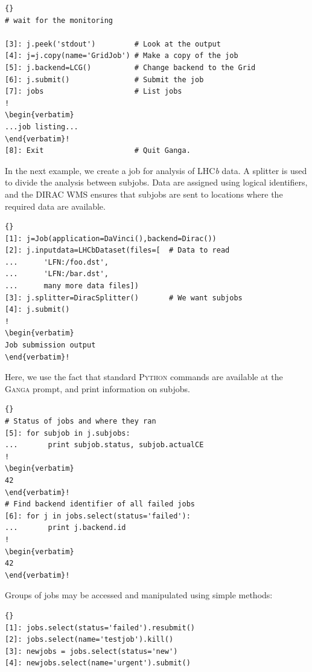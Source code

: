 \documentclass{elsart}
\def\lhcb {LHC{\em b\/}\xspace}
\def\dirac{DIRAC\xspace}
\def\ganga {\textsc{Ganga}\xspace}
\def\python {\textsc{Python}\xspace}
\begin{document}
\begin{linenumbers}
\begin{lstlisting}[escapechar=!]{}
# wait for the monitoring

[3]: j.peek('stdout')         # Look at the output
[4]: j=j.copy(name='GridJob') # Make a copy of the job
[5]: j.backend=LCG()          # Change backend to the Grid
[6]: j.submit()               # Submit the job
[7]: jobs                     # List jobs
!
\begin{verbatim}
...job listing...
\end{verbatim}!
[8]: Exit                     # Quit Ganga.
\end{lstlisting}
\normalsize

\vspace{-2ex}
In the next example, we create a job for analysis of \lhcb
data. A splitter is used to divide the analysis between subjobs.
Data are assigned using logical identifiers, and the \dirac WMS ensures
that subjobs are sent to locations where the required data are available.
\tiny
\begin{lstlisting}[escapechar=!]{}
[1]: j=Job(application=DaVinci(),backend=Dirac())
[2]: j.inputdata=LHCbDataset(files=[  # Data to read
...      'LFN:/foo.dst',
...      'LFN:/bar.dst',
...      many more data files])
[3]: j.splitter=DiracSplitter()       # We want subjobs
[4]: j.submit()
!
\begin{verbatim}
Job submission output
\end{verbatim}!
\end{lstlisting}
\normalsize

\vspace{-2ex}
Here, we use the fact that standard \python commands are available at the
\ganga prompt, and print information on subjobs.
\tiny
\begin{lstlisting}[escapechar=!]{}
# Status of jobs and where they ran
[5]: for subjob in j.subjobs: 
...       print subjob.status, subjob.actualCE
!
\begin{verbatim}
42
\end{verbatim}!
# Find backend identifier of all failed jobs
[6]: for j in jobs.select(status='failed'):
...       print j.backend.id
!
\begin{verbatim}
42
\end{verbatim}!
\end{lstlisting}
\normalsize

\vspace{-2ex}

Groups of jobs may be accessed and manipulated using simple methods:

\tiny
\begin{lstlisting}[escapechar=!]{}
[1]: jobs.select(status='failed').resubmit()
[2]: jobs.select(name='testjob').kill()
[3]: newjobs = jobs.select(status='new')
[4]: newjobs.select(name='urgent').submit()
\end{lstlisting}
\normalsize


\end{linenumbers}
\end{document}
